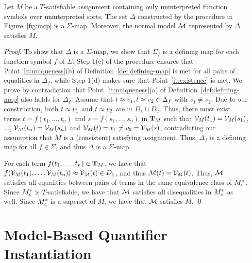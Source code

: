\documentclass{svjour3}                     %
\begin{document}
\begin{proposition}
Let $M$ be a $T$-satisfiable assignment containing only uninterpreted function symbols 
over uninterpreted sorts.
The set $\Delta$ constructed by the procedure in Figure~\ref{fig:mcp} is a $\Sigma$-map.
Moreover, the normal model $\mathcal{M}$ represented by $\Delta$ satisfies $M$.
\end{proposition}

\begin{proof}
To show that $\Delta$ is a $\Sigma$-map, 
we show that $\Sigma_f$ is a defining map for each function symbol $f$ of $\Sigma$.
Step 1(c) of the procedure ensures that 
Point~\ref{it:uniqueness}(b) of Definition~\ref{def:defining-map} is met for all pairs 
of equalities in $\Delta_f$,
while Step 1(d) makes sure that Point~\ref{it:existence} is met.
We prove by contradiction that Point~\ref{it:uniqueness}(a) of 
Definition~\ref{def:defining-map} also holds for $\Delta_f$.
Assume that $t \approx v_1, t \approx v_2 \in \Delta_f$ with $v_1 \neq v_2$. 
Due to our construction, both $t \approx v_1$ and $t \approx v_2$ are in $D_1 \cup D_2$.
Thus, there must exist terms 
$t = f( t_1, \ldots, t_n )$ and $s = f( s_1, \ldots, s_n )$ in $\mathbf{T}_M$ 
such that $\mathcal{V}_{M}(t_1) = \mathcal{V}_{M}(s_1)$, $\ldots$, $\mathcal{V}_{M}(t_n) = \mathcal{V}_{M}( s_n )$
and $\mathcal{V}_{M}(t) = v_1 \neq v_2 = \mathcal{V}_{M}(s)$,
contradicting our assumption that $M$ is a (consistent) satisfying assignment.
Thus, $\Delta_f$ is a defining map for all $f \in \Sigma$, and thus $\Delta$ is a $\Sigma$-map.

For each term $f( t_1, \ldots, t_n ) \in \mathbf{T}_M$, 
we have that $f( \mathcal{V}_{ M }( t_1 ), \ldots, \mathcal{V}_{ M }( t_n ) ) \approx \mathcal{V}_{M}(t) \in D_1$,
and thus $\mathcal{M}( t ) = \mathcal{V}_{M}( t )$.
Thus, $\mathcal{M}$ satisfies all equalities between pairs of terms in the same equivalence class of $M^{*}_{c}$.
Since $M^{*}_{c}$ is $T$-satisfiable, we have that $\mathcal{M}$ satisfies all disequalities in $M^{*}_{c}$ as well.
Since $M^{*}_{c}$ is a superset of $M$, we have that $\mathcal{M}$ satisfies $M$.
\qed
\end{proof}


\section{Model-Based Quantifier Instantiation}
\label{sec:fmf-mbqi}
\end{document}
